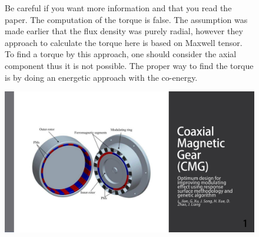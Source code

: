 \begin{figure}[H]
    \begin{minipage}{.45\linewidth}
       Be careful if you want more information and that you read the paper. The computation of the torque is false. The assumption was made earlier that the flux density was purely radial, however they approach to calculate the torque here is based on Maxwell tensor. To find a torque by this approach, one should consider the axial component thus it is not possible. The proper way to find the torque is by doing an energetic approach with the co-energy.
    \end{minipage}
    \hfill%
    \begin{minipage}[c]{.45\linewidth}
        \centering
        \includegraphics[page={30},width=\textwidth]{LELEC2311.allow.pdf}
    \end{minipage}
\end{figure}

